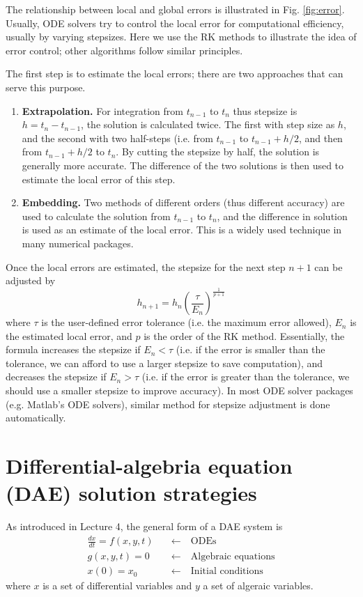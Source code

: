 \documentclass[a4paper,11pt]{article}
\theoremstyle{definition}
\begin{document}
The relationship between local and global errors is illustrated in Fig. \ref{fig:error}.
Usually, ODE solvers try to control the local error for computational efficiency, usually
by varying stepsizes. Here we use the RK methods to illustrate the idea of error control;
other algorithms follow similar principles.

The first step is to estimate the local errors; there are two approaches that can serve this purpose.
\begin{enumerate}
	\item \textbf{Extrapolation.} For integration from $t_{n-1}$ to $t_n$ thus stepsize is $h=t_n - t_{n-1}$, 
		the solution is calculated twice. The first with step size as $h$, and the second with two half-steps
		(i.e. from $t_{n-1}$ to $t_{n-1} + h/2$, and then from $t_{n-1} + h/2$ to $t_n$. By cutting the stepsize
		by half, the solution is generally more accurate. The difference of the two solutions is then used
		to estimate the local error of this step.
	\item \textbf{Embedding.} Two methods of different orders (thus different accuracy) are used to calculate
		the solution from $t_{n-1}$ to $t_n$, and the difference in solution is used as an estimate of the local error.
		This is a widely used technique in many numerical packages.
\end{enumerate}

Once the local errors are estimated, the stepsize for the next step $n+1$ can be adjusted by
\[ h_{n+1} = h_n \left( \frac{\tau}{E_n} \right)^{\frac{1}{p+1}} \]
\noindent where $\tau$ is the user-defined error tolerance (i.e. the maximum error allowed),
$E_n$ is the estimated local error, and $p$ is the order of the RK method.
Essentially, the formula increases the stepsize if $E_n < \tau$ (i.e. if the error is smaller than
the tolerance, we can afford to use a larger stepsize to save computation), and decreases the stepsize
if $E_n > \tau$ (i.e. if the error is greater than
the tolerance, we should use a smaller stepsize to improve accuracy).
In most ODE solver packages (e.g. Matlab's ODE solvers), similar method for stepsize adjustment is done
automatically.


\section{Differential-algebria equation (DAE) solution strategies}

As introduced in Lecture 4, the general form of a DAE system is
\begin{align}
	\frac{d x}{d t} = f(x, y, t) \quad &\leftarrow \quad \textrm{ODEs} \\
	g(x, y, t) = 0 \quad &\leftarrow \quad \textrm{Algebraic equations} \\
	x(0) = x_0  \quad &\leftarrow \quad \textrm{Initial conditions}
\end{align}
\noindent where $x$ is a set of differential variables and $y$ a set of algeraic variables.
\end{document}
